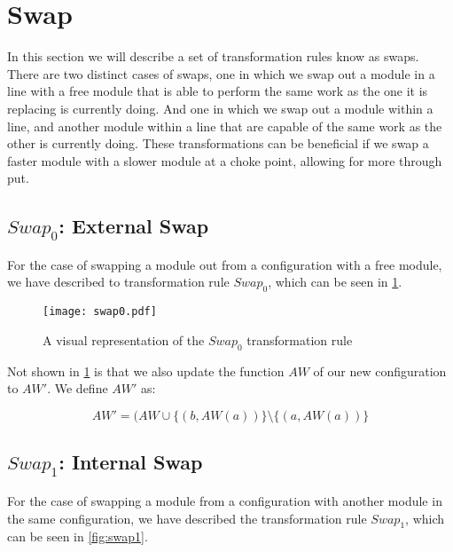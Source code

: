 \section{Swap}
In this section we will describe a set of transformation rules know as swaps. There are two distinct cases of swaps, one in which we swap out a module in a line with a free module that is able to perform the same work as the one it is replacing is currently doing. And one in which we swap out a module within a line, and another module within a line that are capable of the same work as the other is currently doing. These transformations can be beneficial if we swap a faster module with a slower module at a choke point, allowing for more through put.

\subsection{$Swap_0$: External Swap}
For the case of swapping a module out from a configuration with a free module, we have described to transformation rule $Swap_0$, which can be seen in \cref{fig:swap0}.

\begin{figure}[H]
	\centering
	\texttt{[image: swap0.pdf]}
	\caption{A visual representation of the $Swap_0$ transformation rule}
	\label{fig:swap0}
\end{figure}

Not shown in \cref{fig:swap0} is that we also update the function $AW$ of our new configuration to $AW'$. We define $AW'$ as:

\[AW' = (AW \cup \{(b, AW(a))\} \setminus \{(a, AW(a))\}\]






\subsection{$Swap_1$: Internal Swap}
For the case of swapping a module from a configuration with another module in the same configuration, we have described the transformation rule $Swap_1$, which can be seen in \cref{fig:swap1}.

